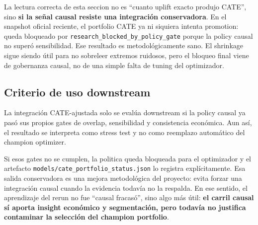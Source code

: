 \documentclass[
  spanish,
  11pt,
  letterpaper,
]{scrbook}
\theoremstyle{plain}
\theoremstyle{remark}
\begin{document}
\begin{tcolorbox}[enhanced jigsaw, arc=.35mm, bottomrule=.15mm, bottomtitle=1mm, breakable, colback=white, colbacktitle=quarto-callout-tip-color!10!white, colframe=quarto-callout-tip-color-frame, coltitle=black, left=2mm, leftrule=.75mm, opacityback=0, opacitybacktitle=0.6, rightrule=.15mm, title=\textcolor{quarto-callout-tip-color}{\faLightbulb}\hspace{0.5em}{Interpretacion del efecto del shrinkage y del gate causal}, titlerule=0mm, toprule=.15mm, toptitle=1mm]

La lectura correcta de esta seccion no es ``cuanto uplift exacto produjo
CATE'', sino \textbf{si la señal causal resiste una integración
conservadora}. En el snapshot oficial reciente, el portfolio CATE ya ni
siquiera intenta promotion: queda bloqueado por
\texttt{research\_blocked\_by\_policy\_gate} porque la policy causal no
superó sensibilidad. Ese resultado es metodológicamente sano. El
shrinkage sigue siendo útil para no sobreleer extremos ruidosos, pero el
bloqueo final viene de gobernanza causal, no de una simple falta de
tuning del optimizador.

\end{tcolorbox}

\subsection{Criterio de uso
downstream}\label{criterio-de-uso-downstream}

La integración CATE-ajustada solo se evalúa downstream si la policy
causal ya pasó sus propios gates de overlap, sensibilidad y consistencia
económica. Aun así, el resultado se interpreta como stress test y no
como reemplazo automático del champion optimizer.

Si esos gates no se cumplen, la politica queda bloqueada para el
optimizador y el artefacto \texttt{models/cate\_portfolio\_status.json}
lo registra explícitamente. Esa salida conservadora es una mejora
metodológica del proyecto: evita forzar una integración causal cuando la
evidencia todavía no la respalda. En ese sentido, el aprendizaje del
rerun no fue ``causal fracasó'', sino algo más útil: \textbf{el carril
causal sí aporta insight económico y segmentación, pero todavía no
justifica contaminar la selección del champion portfolio}.
\end{document}
